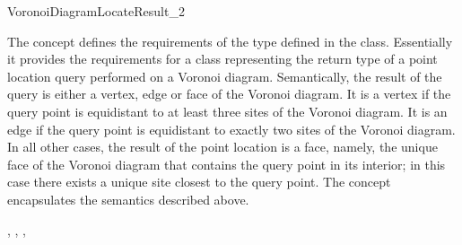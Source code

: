 


\begin{ccRefConcept}{VoronoiDiagramLocateResult_2}

\ccDefinition

The concept  defines the requirements of the
 type defined in the 
class. Essentially it provides the requirements for a class
representing the return type of a point location query performed on a
Voronoi diagram. Semantically, the result of the query is either a
vertex, edge or face of the Voronoi diagram. It is a vertex if the
query point is equidistant to at least three sites of the Voronoi
diagram. It is an edge if the query point is equidistant to exactly
two sites of the Voronoi diagram. In all other cases, the result
of the point location is a face, namely, the unique face of the
Voronoi diagram that contains the query point in its interior; in this
case there exists a unique site closest to the query point. The
 concept encapsulates the 
semantics described above.

\ccRefines
{}, , ,

\ccTypes
{}
\ccThreeToTwo
%
\ccGlue
{}
\ccGlue
{}



\end{ccRefConcept}

